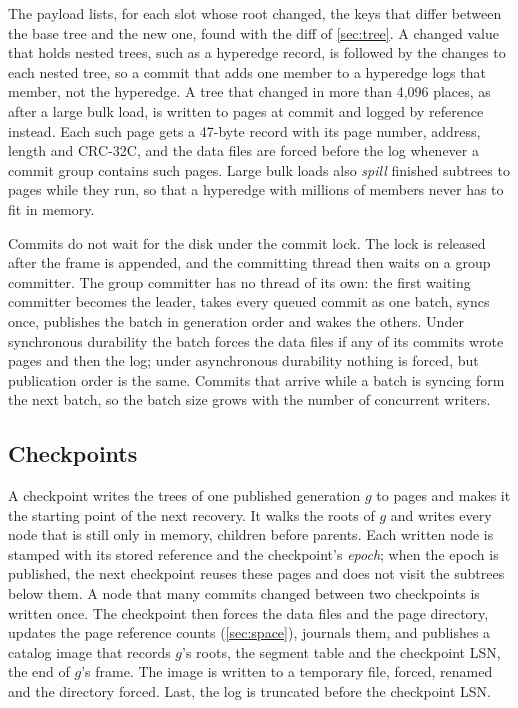 The  payload lists, for each slot whose root changed, the keys that differ between the base tree and the new one, found with the diff of \cref{sec:tree}. A changed value that holds nested trees, such as a hyperedge record, is followed by the changes to each nested tree, so a commit that adds one member to a hyperedge logs that member, not the hyperedge. A tree that changed in more than 4,096 places, as after a large bulk load, is written to pages at commit and logged by reference instead. Each such page gets a 47-byte  record with its page number, address, length and CRC-32C, and the data files are forced before the log whenever a commit group contains such pages. Large bulk loads also \emph{spill} finished subtrees to pages while they run, so that a hyperedge with millions of members never has to fit in memory.

Commits do not wait for the disk under the commit lock. The lock is released after the  frame is appended, and the committing thread then waits on a group committer. The group committer has no thread of its own: the first waiting committer becomes the leader, takes every queued commit as one batch, syncs once, publishes the batch in generation order and wakes the others. Under synchronous durability the batch forces the data files if any of its commits wrote pages and then the log; under asynchronous durability nothing is forced, but publication order is the same. Commits that arrive while a batch is syncing form the next batch, so the batch size grows with the number of concurrent writers.

\subsection{Checkpoints}

A checkpoint writes the trees of one published generation $g$ to pages and makes it the starting point of the next recovery. It walks the roots of $g$ and writes every node that is still only in memory, children before parents. Each written node is stamped with its stored reference and the checkpoint's \emph{epoch}; when the epoch is published, the next checkpoint reuses these pages and does not visit the subtrees below them. A node that many commits changed between two checkpoints is written once. The checkpoint then forces the data files and the page directory, updates the page reference counts (\cref{sec:space}), journals them, and publishes a catalog image that records $g$'s roots, the segment table and the checkpoint LSN, the end of $g$'s  frame. The image is written to a temporary file, forced, renamed and the directory forced. Last, the log is truncated before the checkpoint LSN.

